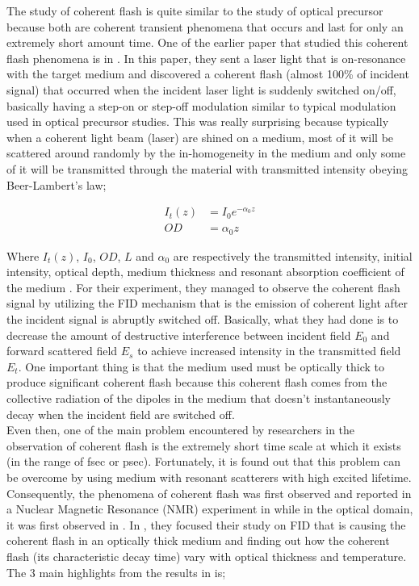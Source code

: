 The study of coherent flash is quite similar to the study of optical precursor because both are coherent transient phenomena that occurs and last for only an extremely short amount time. One of the earlier paper that studied this coherent flash phenomena is in \cite{Chalony2011}. In this paper, they sent a laser light that is on-resonance with the target medium and discovered a coherent flash (almost 100\% of incident signal) that occurred when the incident laser light is suddenly switched on/off, basically having a step-on or step-off modulation similar to typical modulation used in optical precursor studies. This was really surprising because typically when a coherent light beam (laser) are shined on a medium, most of it will be scattered around randomly by the in-homogeneity in the medium and only some of it will be transmitted through the material with transmitted intensity obeying Beer-Lambert's law;

\begin{align}
    I_{t}(z) &= I_{0} e^{- \alpha_{0} z}\\
    OD &= \alpha_{0} z
\end{align}

Where $I_{t}(z)$, $I_{0}$, $OD$, $L$ and $\alpha_{0}$ are respectively the transmitted intensity, initial intensity, optical depth, medium thickness and resonant absorption coefficient of the medium \cite{Chalony2011}. For their experiment, they managed to observe the coherent flash signal by utilizing the FID mechanism that is the emission of coherent light after the incident signal is abruptly switched off. Basically, what they had done is to decrease the amount of destructive interference between incident field $E_0$ and forward scattered field $E_s$ to achieve increased intensity in the transmitted field $E_t$. One important thing is that the medium used must be optically thick to produce significant coherent flash because this coherent flash comes from the collective radiation of the dipoles in the medium that doesn't instantaneously decay when the incident field are switched off.\\

Even then, one of the main problem encountered by researchers in the observation of coherent flash is the extremely short time scale at which it exists (in the range of fsec or psec). Fortunately, it is found out that this problem can be overcome by using medium with resonant scatterers with high excited lifetime. Consequently, the phenomena of coherent flash was first observed and reported in a Nuclear Magnetic Resonance (NMR) experiment in \cite{Hahn1950} while in the optical domain, it was first observed in \cite{Brewer1972, Foster1974}. In \cite{Chalony2011}, they focused their study on FID that is causing the coherent flash in an optically thick medium and finding out how the coherent flash (its characteristic decay time) vary with optical thickness and temperature. The 3 main highlights from the results in \cite{Chalony2011} is;

